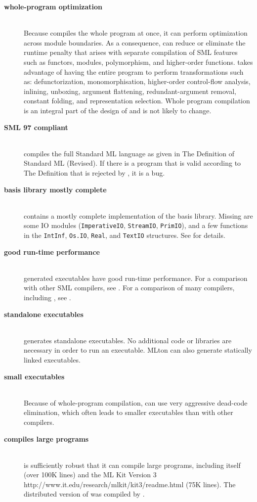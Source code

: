 
\newcommand{\feature}[1]{\item[\bf #1]\hspace{1in}\\}
\begin{description}
\feature{whole-program optimization}
Because {\mlton} compiles the whole program at once, it can perform optimization
across module boundaries.  As a consequence, {\mlton} can reduce or eliminate
the runtime penalty that arises with separate compilation of SML features such
as functors, modules, polymorphism, and higher-order functions.  {\mlton} takes
advantage of having the entire program to perform transformations such as:
defunctorization, monomorphisation, higher-order control-flow analysis,
inlining, unboxing, argument flattening, redundant-argument removal, constant
folding, and representation selection.  Whole program compilation is an integral
part of the design of {\mlton} and is not likely to change.

\feature{SML 97 compliant}
{\mlton} compiles the full Standard ML language as given in The
Definition of Standard ML (Revised)\cite{MTHM97}.  If there is a
program that is valid according to The Definition that is rejected by
{\mlton}, it is a bug.

\feature{basis library mostly complete}
{\mlton} contains a mostly complete implementation of the basis library.
Missing are some IO modules ({\tt ImperativeIO}, {\tt StreamIO},
{\tt PrimIO}), and a few functions in the {\tt IntInf}, {\tt Os.IO}, {\tt Real},
and {\tt TextIO} structures.  See  for details.

\feature{good run-time performance}
{\mlton} generated executables have good run-time performance.
For a comparison with other SML compilers, see
.
For a comparison of many compilers, including {\mlton}, see
.

\feature{standalone executables}
{\mlton} generates standalone executables.  No additional code or
libraries are necessary in order to run an executable.  MLton can also generate
statically linked executables.

\feature{small executables}
Because of whole-program compilation, {\mlton} can use very aggressive 
dead-code elimination, which often leads to smaller executables than
with other compilers.

\feature{compiles large programs}
{\mlton} is sufficiently robust that it can compile large programs,
including itself (over 100K lines) and the
\htmladdnormallink
  {ML Kit Version 3}
  {http://www.it.edu/research/mlkit/kit3/readme.html}
(75K lines).
The distributed version of {\mlton} was compiled by {\mlton}.


\end{description}
